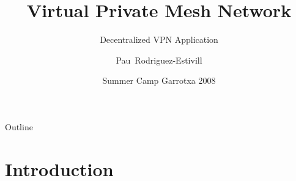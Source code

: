 \documentclass{beamer}
\title[VPMN]{Virtual Private Mesh Network} %
\subtitle{Decentralized VPN Application} %
\author[Pau]{Pau~Rodriguez-Estivill}
\institute[EPSC UPC] %
{
  Escola Polit\`ecnica Superior de Castelldefels\\
  Universitat Polit\`ecnica de Catalunya
}
\date[SCG08] %
{Summer Camp Garrotxa 2008}
\begin{document}
\begin{frame}
  \titlepage
\end{frame}

\begin{frame}{Outline}
  \tableofcontents
\end{frame}



\section{Introduction}
\end{document}
